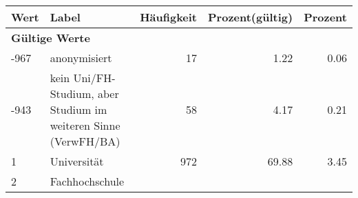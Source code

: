      \begin{longtable}{lXrrr}
     \toprule
     \textbf{Wert} & \textbf{Label} & \textbf{Häufigkeit} & \textbf{Prozent(gültig)} & \textbf{Prozent} \\
     \endhead
     \midrule
     \multicolumn{5}{l}{\textbf{Gültige Werte}}\\

     -967 &
     \multicolumn{1}{X}{ anonymisiert   } &


       \num{17} &
       \num[round-mode=places,round-precision=2]{1.22} &
         \num[round-mode=places,round-precision=2]{0.06} \\

     -943 &
     \multicolumn{1}{X}{ kein Uni/FH-Studium, aber Studium im weiteren Sinne (VerwFH/BA)   } &


       \num{58} &
       \num[round-mode=places,round-precision=2]{4.17} &
         \num[round-mode=places,round-precision=2]{0.21} \\

     1 &
     \multicolumn{1}{X}{ Universität   } &


       \num{972} &
       \num[round-mode=places,round-precision=2]{69.88} &
         \num[round-mode=places,round-precision=2]{3.45} \\

     2 &
     \multicolumn{1}{X}{ Fachhochschule   } &



\end{longtable}
